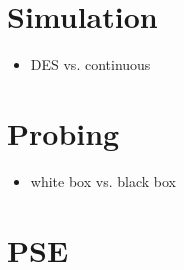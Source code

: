\section{Simulation}
\begin{itemize}
\item DES vs. continuous
\end{itemize}

\section{Probing}
\begin{itemize}
\item white box vs. black box
\end{itemize}

\section{PSE}


